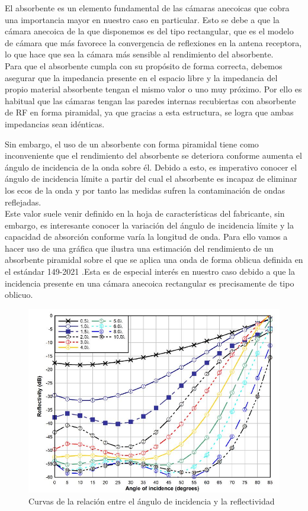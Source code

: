 \documentclass{article}
\begin{document}
El absorbente es un elemento fundamental de las cámaras anecoicas que cobra una importancia mayor en nuestro caso en particular. Esto se debe a que la cámara anecoica de la que disponemos es del tipo rectangular, que es el modelo de cámara que más favorece la convergencia de reflexiones en la antena receptora, lo que hace que sea la cámara más sensible al rendimiento del absorbente.
\\

Para que el absorbente cumpla con su propósito de forma correcta, debemos asegurar que la impedancia presente en el espacio libre y la impedancia del propio material absorbente tengan el mismo valor o uno muy próximo. Por ello es habitual que las cámaras tengan las paredes internas recubiertas con absorbente de RF en forma piramidal, ya que gracias a esta estructura, se logra que ambas impedancias sean idénticas. 

Sin embargo, el uso de un absorbente con forma piramidal tiene como inconveniente que el rendimiento del absorbente se deteriora conforme aumenta el ángulo de incidencia de la onda sobre él. Debido a esto, es imperativo conocer el ángulo de incidencia límite a partir del cual el absorbente es incapaz de eliminar los ecos de la onda y por tanto las medidas sufren la contaminación de ondas reflejadas.\\

Este valor suele venir definido en la hoja de características del fabricante, sin embargo, es interesante conocer la variación del ángulo de incidencia límite y la capacidad de absorción conforme varía la longitud de onda. Para ello vamos a hacer uso de una gráfica que ilustra una estimación del rendimiento de un absorbente piramidal sobre el que se aplica una onda de forma oblicua definida en el estándar 149-2021 \autocite{IEEEstd}.Esta es de especial interés en nuestro caso debido a que la incidencia presente en una cámara anecoica rectangular es precisamente de tipo oblicuo. 

\newpage

\begin{figure}
    \centering
    \includegraphics[scale=0.65]{Tabla-limite-angulo-incidencia}
    \caption{Curvas de la relación entre el ángulo de incidencia y la reflectividad}
    \label{Tabla-limite-angulo-incidencia}
\end{figure}
\end{document}
